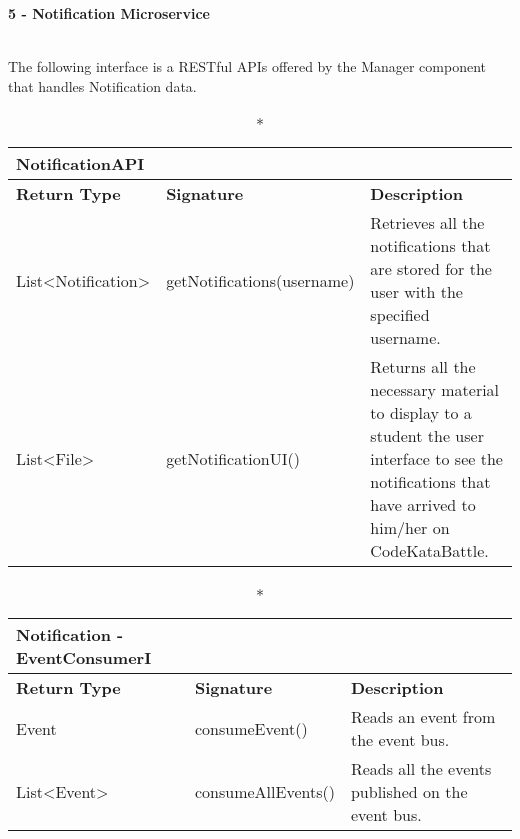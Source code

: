 \begin{large}{\textbf{5 - Notification Microservice}}\end{large}\\
The following interface is a RESTful APIs offered by the Manager component that handles Notification data.
\begin{longtable}{|p{2.5cm} p{6.5cm} p{4.5cm}|}
	\caption*{NotificationAPI}\\ 
	
	\hline
	\textbf{Return Type} & \textbf{Signature} & \textbf{Description}\\
	\hline \endhead
	
	List\textless Notification\textgreater & getNotifications(username) & Retrieves all the notifications that are stored for the user with the specified username.\\
	
	List\textless File\textgreater & getNotificationUI() & Returns all the necessary material to display to a student the user interface to see the notifications that have arrived to him/her on CodeKataBattle.\\
	
	\hline
	
\end{longtable}




\begin{longtable}{|p{2.5cm} p{6.5cm} p{4.5cm}|}
	\caption*{Notification - EventConsumerI}\\ 
	
	\hline
	\textbf{Return Type} & \textbf{Signature} & \textbf{Description}\\
	\hline \endhead
	
	Event & consumeEvent()  & Reads an event from the event bus.\\
	
	List\textless Event\textgreater & consumeAllEvents() & Reads all the events published on the event bus.\\
	
	\hline
	
\end{longtable}


\pagebreak

